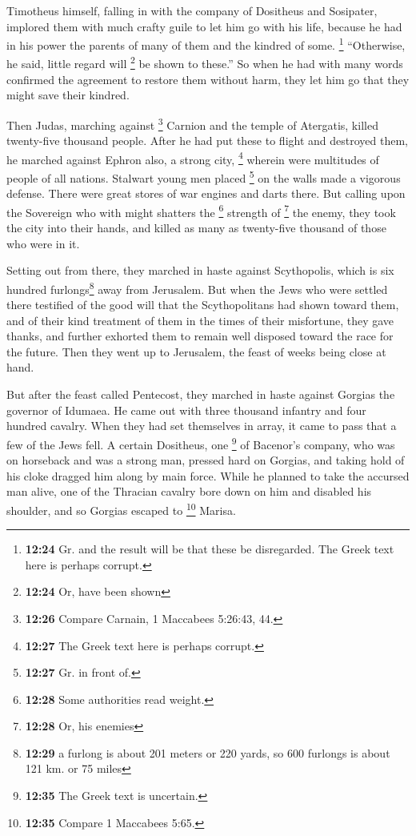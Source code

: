  Timotheus himself, falling in with the company of
Dositheus and Sosipater, implored them with much crafty guile to let him
go with his life, because he had in his power the parents of many of
them and the kindred of some. \footnote{\textbf{12:24} Gr. and the
  result will be that these be disregarded. The Greek text here is
  perhaps corrupt.} ``Otherwise, he said, little regard will \footnote{\textbf{12:24}
  Or, have been shown} be shown to these.''  So when he
had with many words confirmed the agreement to restore them without
harm, they let him go that they might save their kindred.

 Then Judas, marching against \footnote{\textbf{12:26}
  Compare Carnain, 1 Maccabees 5:26:43, 44.} Carnion and the temple of
Atergatis, killed twenty-five thousand people.  After he
had put these to flight and destroyed them, he marched against Ephron
also, a strong city, \footnote{\textbf{12:27} The Greek text here is
  perhaps corrupt.} wherein were multitudes of people of all nations.
Stalwart young men placed \footnote{\textbf{12:27} Gr. in front of.} on
the walls made a vigorous defense. There were great stores of war
engines and darts there.  But calling upon the Sovereign
who with might shatters the \footnote{\textbf{12:28} Some authorities
  read weight.} strength of \footnote{\textbf{12:28} Or, his enemies}
the enemy, they took the city into their hands, and killed as many as
twenty-five thousand of those who were in it.

 Setting out from there, they marched in haste against
Scythopolis, which is six hundred furlongs\footnote{\textbf{12:29} a
  furlong is about 201 meters or 220 yards, so 600 furlongs is about 121
  km. or 75 miles} away from Jerusalem.  But when the
Jews who were settled there testified of the good will that the
Scythopolitans had shown toward them, and of their kind treatment of
them in the times of their misfortune,  they gave thanks,
and further exhorted them to remain well disposed toward the race for
the future. Then they went up to Jerusalem, the feast of weeks being
close at hand.

 But after the feast called Pentecost, they marched in
haste against Gorgias the governor of Idumaea.  He came
out with three thousand infantry and four hundred cavalry.
 When they had set themselves in array, it came to pass
that a few of the Jews fell.  A certain Dositheus, one
\footnote{\textbf{12:35} The Greek text is uncertain.} of Bacenor's
company, who was on horseback and was a strong man, pressed hard on
Gorgias, and taking hold of his cloke dragged him along by main force.
While he planned to take the accursed man alive, one of the Thracian
cavalry bore down on him and disabled his shoulder, and so Gorgias
escaped to \footnote{\textbf{12:35} Compare 1 Maccabees 5:65.} Marisa.

